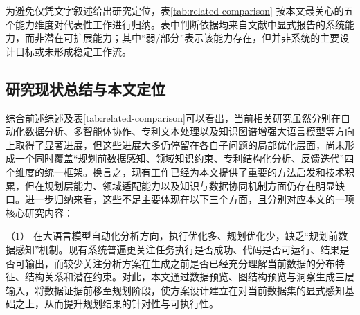为避免仅凭文字叙述给出研究定位，表\ref{tab:related-comparison} 按本文最关心的五个能力维度对代表性工作进行归纳。表中判断依据均来自文献中显式报告的系统能力，而非潜在可扩展能力；其中“弱/部分”表示该能力存在，但并非系统的主要设计目标或未形成稳定工作流。

\begin{table}[htbp]
\centering
\caption{相关代表性工作与本文的能力维度对比}
\label{tab:related-comparison}
\end{table}

\subsection{研究现状总结与本文定位}

综合前述综述及表\ref{tab:related-comparison}可以看出，当前相关研究虽然分别在自动化数据分析、多智能体协作、专利文本处理以及知识图谱增强大语言模型等方向上取得了显著进展，但这些进展大多仍停留在各自子问题的局部优化层面，尚未形成一个同时覆盖“规划前数据感知、领域知识约束、专利结构化分析、反馈迭代”四个维度的统一框架。换言之，现有工作已经为本文提供了重要的方法启发和技术积累，但在规划层能力、领域适配能力以及知识与数据协同机制方面仍存在明显缺口。进一步归纳来看，这些不足主要体现在以下三个方面，且分别对应本文的一项核心研究内容：


（1） 在大语言模型自动化分析方向，执行优化多、规划优化少，缺乏“规划前数据感知”机制。现有系统普遍更关注任务执行是否成功、代码是否可运行、结果是否可输出，而较少关注分析方案在生成之前是否已经充分理解当前数据的分布特征、结构关系和潜在约束。对此，本文通过数据预览、图结构预览与洞察生成三层输入，将数据证据前移至规划阶段，使方案设计建立在对当前数据集的显式感知基础之上，从而提升规划结果的针对性与可执行性。

